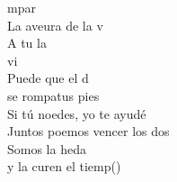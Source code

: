 \begin{cancion}
	\begin{chorus}%
	mpar\\
	La aveura de la v\\
	A tu la\\
	vi \\
	Puede que el d\\
	se rompatus pies \\
	Si tú noedes, yo te ayudé \\
	Juntos poemos vencer los dos\\
	Somos la heda \\
	y la curen el tiemp()\\
	\end{chorus}%
	\jump\\
\end{cancion}%
